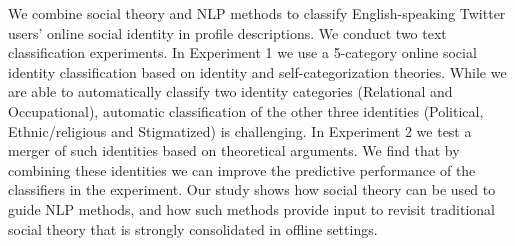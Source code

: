 We combine social theory and NLP methods to classify English-speaking Twitter users' online social identity in profile descriptions. We conduct two text classification experiments. In Experiment 1 we use a 5-category online social identity classification based on identity and self-categorization theories. While we are able to automatically classify two identity categories (Relational and Occupational), automatic classification of the other three identities (Political, Ethnic/religious and Stigmatized) is challenging. In Experiment 2 we test a merger of such identities based on theoretical arguments. We find that by combining these identities we can improve the predictive performance of the classifiers in the experiment. Our study shows how social theory can be used to guide NLP methods, and how such methods provide input to revisit traditional social theory that is strongly consolidated in offline settings.
